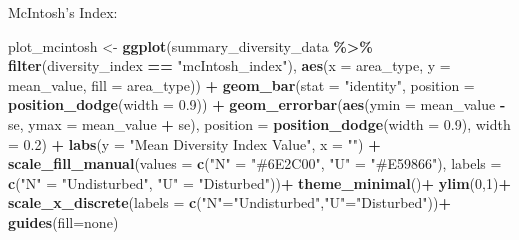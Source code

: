 \documentclass[
]{article}
\newenvironment{Shaded}{\begin{snugshade}}{\end{snugshade}}
\newcommand{\AttributeTok}[1]{\textcolor[rgb]{0.13,0.29,0.53}{#1}}
\newcommand{\DecValTok}[1]{\textcolor[rgb]{0.00,0.00,0.81}{#1}}
\newcommand{\FloatTok}[1]{\textcolor[rgb]{0.00,0.00,0.81}{#1}}
\newcommand{\FunctionTok}[1]{\textcolor[rgb]{0.13,0.29,0.53}{\textbf{#1}}}
\newcommand{\NormalTok}[1]{#1}
\newcommand{\OtherTok}[1]{\textcolor[rgb]{0.56,0.35,0.01}{#1}}
\newcommand{\SpecialCharTok}[1]{\textcolor[rgb]{0.81,0.36,0.00}{\textbf{#1}}}
\newcommand{\StringTok}[1]{\textcolor[rgb]{0.31,0.60,0.02}{#1}}
\begin{document}
McIntosh's Index:

\begin{Shaded}
\begin{Highlighting}[]
\NormalTok{  plot\_mcintosh }\OtherTok{\textless{}{-}} \FunctionTok{ggplot}\NormalTok{(summary\_diversity\_data }\SpecialCharTok{\%\textgreater{}\%} \FunctionTok{filter}\NormalTok{(diversity\_index }\SpecialCharTok{==} \StringTok{"mcIntosh\_index"}\NormalTok{), }
                          \FunctionTok{aes}\NormalTok{(}\AttributeTok{x =}\NormalTok{ area\_type, }\AttributeTok{y =}\NormalTok{ mean\_value, }\AttributeTok{fill =}\NormalTok{ area\_type)) }\SpecialCharTok{+}
    \FunctionTok{geom\_bar}\NormalTok{(}\AttributeTok{stat =} \StringTok{"identity"}\NormalTok{, }\AttributeTok{position =} \FunctionTok{position\_dodge}\NormalTok{(}\AttributeTok{width =} \FloatTok{0.9}\NormalTok{)) }\SpecialCharTok{+}
    \FunctionTok{geom\_errorbar}\NormalTok{(}\FunctionTok{aes}\NormalTok{(}\AttributeTok{ymin =}\NormalTok{ mean\_value }\SpecialCharTok{{-}}\NormalTok{ se, }\AttributeTok{ymax =}\NormalTok{ mean\_value }\SpecialCharTok{+}\NormalTok{ se), }
                  \AttributeTok{position =} \FunctionTok{position\_dodge}\NormalTok{(}\AttributeTok{width =} \FloatTok{0.9}\NormalTok{), }
                  \AttributeTok{width =} \FloatTok{0.2}\NormalTok{) }\SpecialCharTok{+}
    \FunctionTok{labs}\NormalTok{(}\AttributeTok{y =} \StringTok{"Mean Diversity Index Value"}\NormalTok{, }\AttributeTok{x =} \StringTok{""}\NormalTok{) }\SpecialCharTok{+}
    \FunctionTok{scale\_fill\_manual}\NormalTok{(}\AttributeTok{values =} \FunctionTok{c}\NormalTok{(}\StringTok{"N"} \OtherTok{=} \StringTok{"\#6E2C00"}\NormalTok{, }\StringTok{"U"} \OtherTok{=} \StringTok{"\#E59866"}\NormalTok{), }\AttributeTok{labels =} \FunctionTok{c}\NormalTok{(}\StringTok{"N"} \OtherTok{=} \StringTok{"Undisturbed"}\NormalTok{, }\StringTok{"U"} \OtherTok{=} \StringTok{"Disturbed"}\NormalTok{))}\SpecialCharTok{+} 
    \FunctionTok{theme\_minimal}\NormalTok{()}\SpecialCharTok{+}
    \FunctionTok{ylim}\NormalTok{(}\DecValTok{0}\NormalTok{,}\DecValTok{1}\NormalTok{)}\SpecialCharTok{+}
    \FunctionTok{scale\_x\_discrete}\NormalTok{(}\AttributeTok{labels =} \FunctionTok{c}\NormalTok{(}\StringTok{"N"}\OtherTok{=}\StringTok{"Undisturbed"}\NormalTok{,}\StringTok{"U"}\OtherTok{=}\StringTok{"Disturbed"}\NormalTok{))}\SpecialCharTok{+}
    \FunctionTok{guides}\NormalTok{(}\AttributeTok{fill=}\StringTok{\textquotesingle{}none\textquotesingle{}}\NormalTok{)}
\end{Highlighting}
\end{Shaded}
\end{document}
